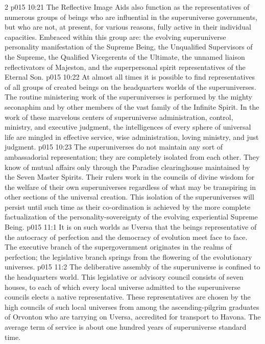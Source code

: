 \begin{multicols}{2}
\pc \vs p015 10:21 The Reflective Image Aids also function as the representatives of numerous groups of beings who are influential in the superuniverse governments, but who are not, at present, for various reasons, fully active in their individual capacities. Embraced within this group are: the evolving superuniverse personality manifestation of the Supreme Being, the Unqualified Supervisors of the Supreme, the Qualified Vicegerents of the Ultimate, the unnamed liaison reflectivators of Majeston, and the superpersonal spirit representatives of the Eternal Son.\plusone
\pc \vs p015 10:22 At almost all times it is possible to find representatives of all groups of created beings on the headquarters worlds of the superuniverses. The routine ministering work of the superuniverses is performed by the mighty seconaphim and by other members of the vast family of the Infinite Spirit. In the work of these marvelous centers of superuniverse administration, control, ministry, and executive judgment, the intelligences of every sphere of universal life are mingled in effective service, wise administration, loving ministry, and just judgment.
\vs p015 10:23 The superuniverses do not maintain any sort of ambassadorial representation; they are completely isolated from each other. They know of mutual affairs only through the Paradise clearinghouse maintained by the Seven Master Spirits. Their rulers work in the councils of divine wisdom for the welfare of their own superuniverses regardless of what may be transpiring in other sections of the universal creation. This isolation of the superuniverses will persist until such time as their co\hyp{}ordination is achieved by the more complete factualization of the personality\hyp{}sovereignty of the evolving experiential Supreme Being.\plusone
{}
\vs p015 11:1 It is on such worlds as Uversa that the beings representative of the autocracy of perfection and the democracy of evolution meet face to face. The executive branch of the supergovernment originates in the realms of perfection; the legislative branch springs from the flowering of the evolutionary universes.
\vs p015 11:2 The deliberative assembly of the superuniverse is confined to the headquarters world. This legislative or advisory council consists of seven houses, to each of which every local universe admitted to the superuniverse councils elects a native representative. These representatives are chosen by the high councils of such local universes from among the ascending\hyp{}pilgrim graduates of Orvonton who are tarrying on Uversa, accredited for transport to Havona. The average term of service is about one hundred years of superuniverse standard time.

\end{multicols}
